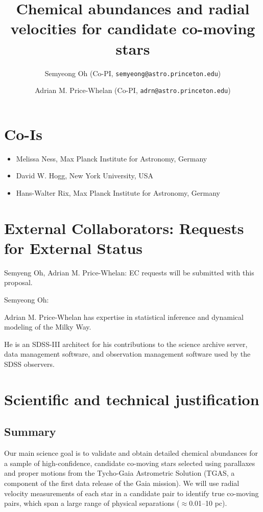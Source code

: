 \documentclass[11pt]{article}
\title{Chemical abundances and radial velocities for candidate co-moving stars}
\author{
  Semyeong Oh (Co-PI, \texttt{semyeong@astro.princeton.edu})
  \and
  Adrian M. Price-Whelan (Co-PI, \texttt{adrn@astro.princeton.edu})
}
\date{}
\begin{document}
\maketitle

\section*{Co-Is}

\begin{itemize}
    \item Melissa Ness, Max Planck Institute for Astronomy, Germany \item David W. Hogg, New York University, USA
    \item Hans-Walter Rix, Max Planck Institute for Astronomy, Germany
\end{itemize}

\section*{External Collaborators: Requests for External Status}

Semyeng Oh, Adrian M. Price-Whelan: EC requests will be submitted with this proposal.

Semyeong Oh:

Adrian M. Price-Whelan has expertise in statistical inference and dynamical
modeling of the Milky Way.

He is an SDSS-III architect for his contributions to the
science archive server, data management software, and observation management
software used by the SDSS observers.

\section{Scientific and technical justification}

\subsection{Summary}

Our main science goal is to validate and obtain detailed chemical abundances for
a sample of high-confidence, candidate co-moving stars selected using parallaxes
and proper motions from the Tycho-Gaia Astrometric Solution (TGAS, a component
of the first data release of the Gaia mission).
We will use radial velocity measurements of each star in a candidate pair to
identify true co-moving pairs, which span a large range of physical separations
($\approx$0.01--10 pc).
\end{document}
